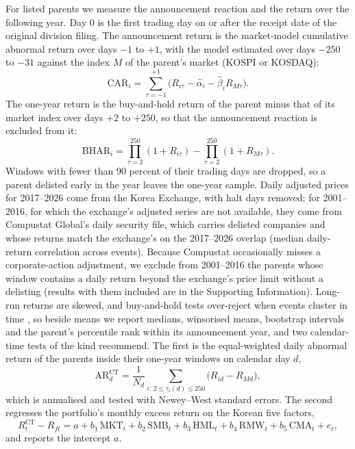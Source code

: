 For listed parents we measure the announcement reaction and the return over the following year. Day 0 is the first trading day on or after the receipt date of the original division filing. The announcement return is the market-model cumulative abnormal return over days $-1$ to $+1$, with the model estimated over days $-250$ to $-31$ against the index $M$ of the parent's market (KOSPI or KOSDAQ):
\begin{equation}\label{eq:car}
\mathrm{CAR}_i = \sum_{\tau=-1}^{+1}\bigl(R_{i\tau} - \hat\alpha_i - \hat\beta_i R_{M\tau}\bigr).
\end{equation}
The one-year return is the buy-and-hold return of the parent minus that of its market index over days $+2$ to $+250$, so that the announcement reaction is excluded from it:
\begin{equation}\label{eq:bhar}
\mathrm{BHAR}_i = \prod_{\tau=2}^{250}(1+R_{i\tau}) - \prod_{\tau=2}^{250}(1+R_{M\tau}).
\end{equation}
Windows with fewer than 90 percent of their trading days are dropped, so a parent delisted early in the year leaves the one-year sample. Daily adjusted prices for 2017--2026 come from the Korea Exchange, with halt days removed; for 2001--2016, for which the exchange's adjusted series are not available, they come from Compustat Global's daily security file, which carries delisted companies and whose returns match the exchange's on the 2017--2026 overlap (median daily-return correlation \KRXCompustatCorr{} across \NPriceOverlap{} events). Because Compustat occasionally misses a corporate-action adjustment, we exclude from 2001--2016 the \GlitchExcluded{} parents whose window contains a daily return beyond the exchange's price limit without a delisting (results with them included are in the Supporting Information). Long-run returns are skewed, and buy-and-hold tests over-reject when events cluster in time \cite{barber1997, lyon1999, fama1998}, so beside means we report medians, winsorised means, bootstrap intervals and the parent's percentile rank within its announcement year, and two calendar-time tests of the kind  recommend. The first is the equal-weighted daily abnormal return of the parents inside their one-year windows on calendar day $d$,
\begin{equation}\label{eq:ct}
\mathrm{AR}^{\mathrm{CT}}_d = \frac{1}{N_d}\sum_{i:\,2\le \tau_i(d)\le 250}\bigl(R_{id} - R_{Md}\bigr),
\end{equation}
which is annualised and tested with Newey--West standard errors. The second regresses the portfolio's monthly excess return on the Korean five factors,
\begin{equation}\label{eq:ff5}
R^{\mathrm{CT}}_{\!t} - R_{ft} = a + b_1\,\mathrm{MKT}_t + b_2\,\mathrm{SMB}_t + b_3\,\mathrm{HML}_t + b_4\,\mathrm{RMW}_t + b_5\,\mathrm{CMA}_t + e_t,
\end{equation}
and reports the intercept $a$.

